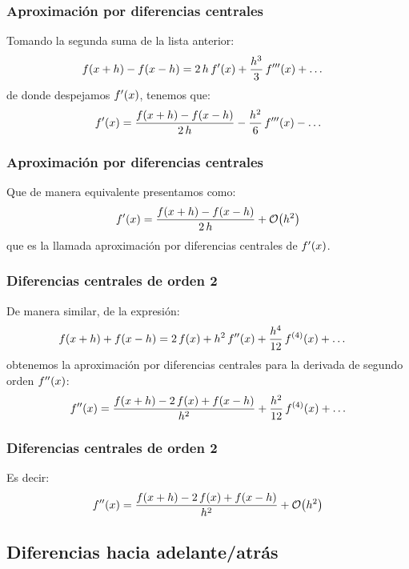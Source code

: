 \documentclass[12pt]{beamer}
\begin{document}
\begin{frame}
\frametitle{Aproximación por diferencias centrales}
Tomando la segunda suma de la lista anterior:
\begin{align*}
f (x + h) - f (x - h) &= 2 \, h \, {f}^{\prime} (x) + \dfrac{h^{3}}{3} \, {f}^{\prime \prime \prime} (x) + \ldots
\end{align*}
\pause
de donde despejamos ${f}^{\prime} (x)$, tenemos que:
\pause
\begin{align*}
{f}^{\prime} (x) = \dfrac{f( x+ h ) - f(x - h)}{2 \, h} - \dfrac{h^{2}}{6} \, {f}^{\prime \prime \prime} (x) - \ldots
\end{align*}
\end{frame}
\begin{frame}
\frametitle{Aproximación por diferencias centrales}
Que de manera equivalente presentamos como:
\pause
\begin{align*}
\pderivada{f} (x) = \dfrac{f(x + h) - f(x - h)}{2 \, h} + \order{h^{2}}
\end{align*}
que es la llamada \textcolor{ao}{aproximación por diferencias centrales} de ${f}^{\prime} (x)$.
\end{frame}
\begin{frame}
\frametitle{Diferencias centrales de orden 2}
De manera similar, de la expresión:
\pause
\begin{align*}
f (x + h) + f (x - h) &= 2 \, f (x) + h^{2} \, {f}^{\prime \prime} (x) + \dfrac{h^{4}}{12} \, f^{(4)}(x) + \ldots
\end{align*}
obtenemos la aproximación por diferencias centrales para la derivada de segundo orden ${f}^{\prime \prime} (x)$:
\pause
\begin{align*}
{f}^{\prime \prime} (x) =  \dfrac{f(x + h) - 2 \, f (x) + f (x - h)}{h^{2}} + \dfrac{h^{2}}{12} \, f^{(4)}(x) + \ldots
\end{align*}
\end{frame}
\begin{frame}
\frametitle{Diferencias centrales de orden 2}
Es decir:
\pause
\begin{align*}
\sderivada{f} (x) =  \dfrac{f(x + h) - 2 \, f (x) + f (x - h)}{h^{2}} + \order{h^{2}}
\end{align*}
\end{frame}

\subsection{Diferencias hacia adelante/atrás}
\end{document}
